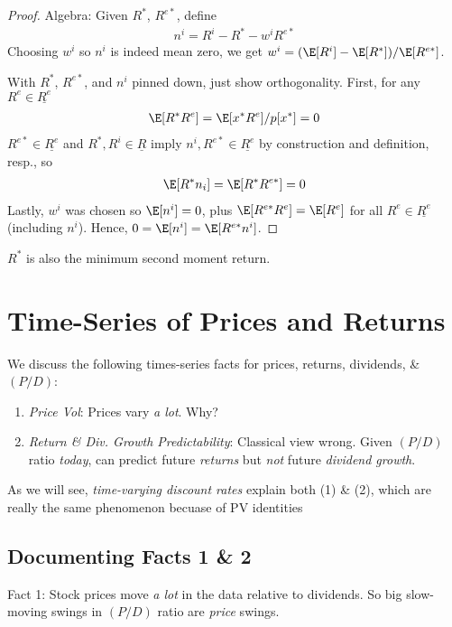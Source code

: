 \documentclass[12pt]{article}
\theoremstyle{plain}
\theoremstyle{definition}
\theoremstyle{remark}
\begin{document}
\begin{multicols*}{2}
\begin{proof}
Algebra:
Given $R^*$, $R^{e*}$, define
\begin{align*}
  n^i = R^i - R^* -w^i R^{e*}
\end{align*}
Choosing $w^i$ so $n^i$ is indeed mean zero, we get
$w^i = (\E[R^i] - \E[R^*])/\E[R^{e*}]$.

With $R^*$, $R^{e*}$, and $n^i$ pinned down, just show orthogonality.
First, for any $R^e\in\underline{R^e}$
\begin{align*}
  \E[R^*R^e]=\E[x^*R^e]/p[x^*]=0
\end{align*}
$R^{e*}\in\underline{R^e}$ and $R^*,R^i\in\underline{R}$
imply $n^i,R^{e*}\in\underline{R^e}$ by construction and definition,
resp., so
\begin{align*}
  \E[R^*n_i]=\E[R^*R^{e*}]=0
\end{align*}
Lastly, $w^i$ was chosen so $\E[n^i]=0$, plus
$\E[R^{e*}R^e]=\E[R^e]$ for all $R^e\in\underline{R^e}$ (including
$n^i$). Hence, $0=\E[n^i] =\E[R^{e*}n^i]$.
\end{proof}

\clearpage
$R^*$ is also the minimum second moment return.


\clearpage
\section{Time-Series of Prices and Returns}

We discuss the following times-series facts for prices,
returns, dividends, \& $(P/D)$:
\begin{enumerate}
  \item \emph{Price Vol}: Prices vary \emph{a lot}. Why?
  \item \emph{Return \& Div. Growth Predictability}:
    Classical view wrong.
    Given $(P/D)$ ratio \emph{today}, can predict future \emph{returns}
    but \emph{not} future \emph{dividend growth}.
\end{enumerate}
As we will see, \emph{time-varying discount rates} explain both (1) \&
(2), which are really the same phenomenon becuase of PV identities

\subsection{Documenting Facts 1 \& 2}
\label{sec:predictability}

Fact 1: Stock prices move \emph{a lot} in the data relative to
dividends.  So big slow-moving swings in $(P/D)$ ratio are \emph{price}
swings.


\end{multicols*}
\end{document}
